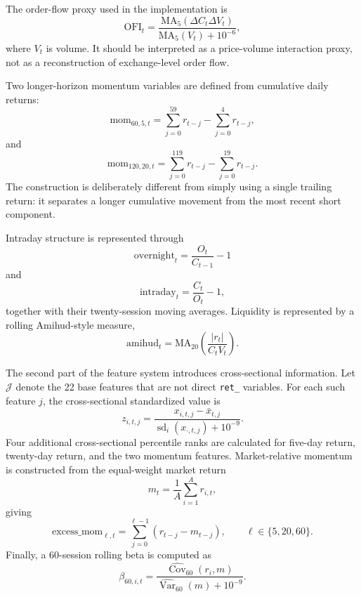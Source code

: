 \documentclass[10pt]{article}
\begin{document}
The order-flow proxy used in the implementation is
\begin{equation}
\mathrm{OFI}_t=
\frac{\mathrm{MA}_{5}(\Delta C_t\Delta V_t)}
{\mathrm{MA}_{5}(V_t)+10^{-6}},
\end{equation}
where $V_t$ is volume. It should be interpreted as a price-volume interaction proxy, not as a reconstruction of exchange-level order flow.

Two longer-horizon momentum variables are defined from cumulative daily returns:
\begin{equation}
\mathrm{mom}_{60,5,t}
=
\sum_{j=0}^{59}r_{t-j}
-
\sum_{j=0}^{4}r_{t-j},
\end{equation}
and
\begin{equation}
\mathrm{mom}_{120,20,t}
=
\sum_{j=0}^{119}r_{t-j}
-
\sum_{j=0}^{19}r_{t-j}.
\end{equation}
The construction is deliberately different from simply using a single trailing return: it separates a longer cumulative movement from the most recent short component.

Intraday structure is represented through
\begin{equation}
\mathrm{overnight}_t=\frac{O_t}{C_{t-1}}-1
\end{equation}
and
\begin{equation}
\mathrm{intraday}_t=\frac{C_t}{O_t}-1,
\end{equation}
together with their twenty-session moving averages. Liquidity is represented by a rolling Amihud-style measure,
\begin{equation}
\mathrm{amihud}_t=
\mathrm{MA}_{20}
\left(
\frac{|r_t|}{C_tV_t}
\right).
\end{equation}

The second part of the feature system introduces cross-sectional information. Let $\mathcal{J}$ denote the 22 base features that are not direct \texttt{ret\_} variables. For each such feature $j$, the cross-sectional standardized value is
\begin{equation}
z_{i,t,j}
=
\frac{x_{i,t,j}-\bar{x}_{t,j}}
{\operatorname{sd}_i(x_{\cdot,t,j})+10^{-9}}.
\end{equation}
Four additional cross-sectional percentile ranks are calculated for five-day return, twenty-day return, and the two momentum features. Market-relative momentum is constructed from the equal-weight market return
\begin{equation}
m_t=\frac{1}{A}\sum_{i=1}^{A}r_{i,t},
\end{equation}
giving
\begin{equation}
\mathrm{excess\_mom}_{\ell,t}
=
\sum_{j=0}^{\ell-1}(r_{t-j}-m_{t-j}),
\qquad
\ell\in\{5,20,60\}.
\end{equation}
Finally, a 60-session rolling beta is computed as
\begin{equation}
\beta_{60,i,t}
=
\frac{\widehat{\operatorname{Cov}}_{60}(r_i,m)}
{\widehat{\operatorname{Var}}_{60}(m)+10^{-9}}.
\end{equation}
\end{document}
